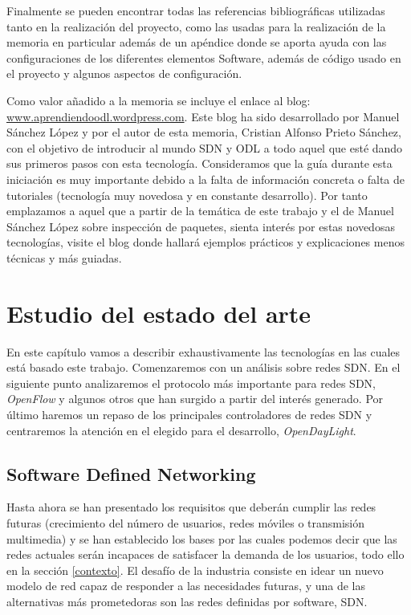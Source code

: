 \documentclass[a4paper,11pt]{book}
\begin{document}
Finalmente se pueden encontrar todas las referencias bibliográficas utilizadas tanto en la realización del proyecto, como las usadas para la realización de la memoria en particular además de un apéndice donde se aporta ayuda con las configuraciones de los diferentes elementos Software, además de código usado en el proyecto y algunos aspectos de configuración.

Como valor añadido a la memoria se incluye el enlace al blog: \url{www.aprendiendoodl.wordpress.com}. Este blog ha sido desarrollado por Manuel Sánchez López y por el autor de esta memoria, Cristian Alfonso Prieto Sánchez, con el objetivo de introducir al mundo \ac{SDN} y \ac{ODL} a todo aquel que esté dando sus primeros pasos con esta tecnología. Consideramos que la guía durante esta iniciación es muy importante debido a la falta de información concreta o falta de tutoriales (tecnología muy novedosa y en constante desarrollo). Por tanto emplazamos a aquel que a partir de la temática de este trabajo y el de Manuel Sánchez López sobre inspección de paquetes, sienta interés por estas novedosas tecnologías, visite el blog donde hallará ejemplos prácticos y explicaciones menos técnicas y más guiadas.


\chapter{Estudio del estado del arte}\label{estado.arte}

En este capítulo vamos a describir exhaustivamente las tecnologías en las cuales está basado este trabajo. Comenzaremos con un análisis sobre redes \ac{SDN}. En el siguiente punto analizaremos el protocolo más importante para redes \ac{SDN}, \emph{OpenFlow} y algunos otros que han surgido a partir del interés generado. Por último haremos un repaso de los principales controladores de redes \ac{SDN} y centraremos la atención en el elegido para el desarrollo, \emph{OpenDayLight}.

\section{Software Defined Networking}\label{SDN}
Hasta ahora se han presentado los requisitos que deberán cumplir las redes futuras (crecimiento del número de usuarios, redes móviles o transmisión multimedia) y se han establecido los bases por las cuales podemos decir que las redes actuales serán incapaces de satisfacer la demanda de los usuarios, todo ello en la sección \ref{contexto}. El desafío de la industria consiste en idear un nuevo modelo de red capaz de responder a las necesidades futuras, y una de las alternativas más prometedoras son las redes definidas por software, \ac{SDN}.
\end{document}
